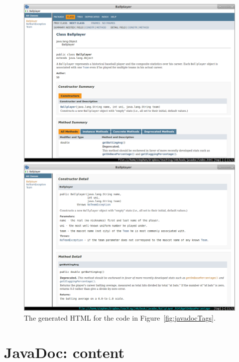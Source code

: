 \begin{figure}
\centering
\includegraphics[width=1\textwidth]{javadoc1.png}

\vspace{.2in}

\includegraphics[width=1\textwidth]{javadoc2.png}

\vspace{.2in}

\caption{The generated HTML for the code in Figure~\ref{fig:javadocTags}.}
\label{fig:javadocApi}
\end{figure}


\section{JavaDoc: content}

